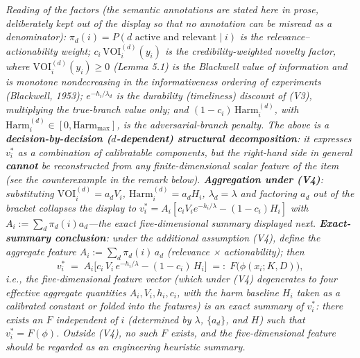 \documentclass[
  11pt]{article}
\begin{document}
\emph{Reading of the factors (the semantic annotations are stated here
in prose, deliberately kept out of the display so that no annotation can
be misread as a denominator):}
\(\pi_d(i) = P(d \text{ active and relevant} \mid i)\) \emph{is the
relevance--actionability weight; \(c_i\,\mathrm{VOI}_i^{(d)}(y_i)\) is
the credibility-weighted novelty factor, where
\(\mathrm{VOI}_i^{(d)}(y_i) \ge 0\) (Lemma 5.1) is the Blackwell value
of information and is monotone nondecreasing in the informativeness
ordering of experiments (Blackwell, 1953); \(e^{-h_i/\lambda_d}\) is the
durability (timeliness) discount of (V3), multiplying the true-branch
value only; and \((1-c_i)\,\mathrm{Harm}_i^{(d)}\), with
\(\mathrm{Harm}_i^{(d)} \in [0, \mathrm{Harm}_{\max}]\), is the
adversarial-branch penalty. The above is a \textbf{decision-by-decision
(\(d\)-dependent) structural decomposition}: it expresses \(v_i^*\) as a
combination of calibratable components, but the right-hand side in
general \textbf{cannot} be reconstructed from any finite-dimensional
scalar feature of the item (see the counterexample in the remark below).
\textbf{Aggregation under (V4)}: substituting
\(\mathrm{VOI}_i^{(d)} = a_d V_i\), \(\mathrm{Harm}_i^{(d)} = a_d H_i\),
\(\lambda_d = \lambda\) and factoring \(a_d\) out of the bracket
collapses the display to
\(v_i^* = A_i[c_iV_ie^{-h_i/\lambda} - (1-c_i)H_i]\) with
\(A_i := \sum_d \pi_d(i)a_d\)---the exact five-dimensional summary
displayed next. \textbf{Exact-summary conclusion}: under the additional
assumption (V4), define the aggregate feature
\(A_i := \sum_d \pi_d(i)\,a_d\) (relevance × actionability); then}
\[v_i^* \;=\; A_i\Big[c_i\,V_i\,e^{-h_i/\lambda} - (1-c_i)\,H_i\Big] \;=:\; F\big(\phi(x_i; K, D)\big),\]
\emph{i.e., the five-dimensional feature vector (which under (V4)
degenerates to four effective aggregate quantities
\(A_i, V_i, h_i, c_i\), with the harm baseline \(H_i\) taken as a
calibrated constant or folded into the features) is an exact summary of
\(v_i^*\): there exists an \(F\) independent of \(i\) (determined by
\(\lambda\), \(\{a_d\}\), and \(H\)) such that \(v_i^* = F(\phi)\).
Outside (V4), no such \(F\) exists, and the five-dimensional feature
should be regarded as an engineering heuristic summary.}
\end{document}

